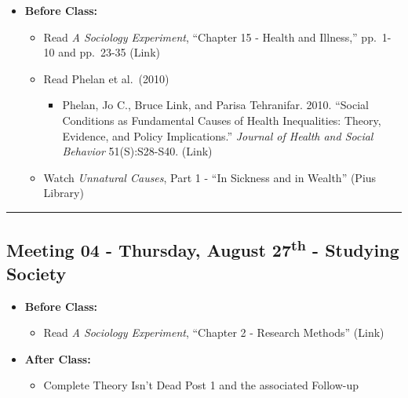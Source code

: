 \documentclass[
]{book}
\providecommand{\tightlist}{%
  \setlength{\itemsep}{0pt}\setlength{\parskip}{0pt}}
\begin{document}
\begin{itemize}
\tightlist
\item
  \textbf{Before Class:}

  \begin{itemize}
  \tightlist
  \item
    Read \emph{A Sociology Experiment}, ``Chapter 15 - Health and Illness,'' pp.~1-10 and pp.~23-35 (Link)
  \item
    Read Phelan et al.~(2010)

    \begin{itemize}
    \tightlist
    \item
      Phelan, Jo C., Bruce Link, and Parisa Tehranifar. 2010. ``Social Conditions as Fundamental Causes of Health Inequalities: Theory, Evidence, and Policy Implications.'' \emph{Journal of Health and Social Behavior} 51(S):S28-S40. (Link)
    \end{itemize}
  \item
    Watch \emph{Unnatural Causes}, Part 1 - ``In Sickness and in Wealth'' (Pius Library)
  \end{itemize}
\end{itemize}

\begin{center}\rule{0.5\linewidth}{0.5pt}\end{center}

\hypertarget{meeting-04---thursday-august-27th---studying-society}{%
\subsection*{\texorpdfstring{Meeting 04 - Thursday, August 27\textsuperscript{th} - Studying Society}{Meeting 04 - Thursday, August 27th - Studying Society}}\label{meeting-04---thursday-august-27th---studying-society}}

\begin{itemize}
\tightlist
\item
  \textbf{Before Class:}

  \begin{itemize}
  \tightlist
  \item
    Read \emph{A Sociology Experiment}, ``Chapter 2 - Research Methods'' (Link)
  \end{itemize}
\item
  \textbf{After Class:}

  \begin{itemize}
  \tightlist
  \item
    Complete Theory Isn't Dead Post 1 and the associated Follow-up
  \end{itemize}
\end{itemize}
\end{document}
